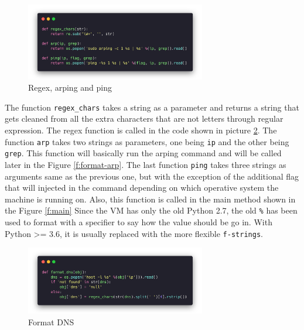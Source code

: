 \begin{figure}[H]
  \centering
  \includegraphics[width=0.7\textwidth]{figures/code/regex-arp-ping}
  \caption{Regex, arping and ping}
  \label{f:regex-arp-ping}
\end{figure}

The function \lstinline{regex_chars} takes a string as a parameter and returns a
string that gets cleaned from all the extra characters that are not letters
through regular expression. The regex function is called in the code shown in
picture \ref{f:format-dns}. The function \lstinline{arp} takes two strings as
parameters, one being \lstinline{ip} and the other being \lstinline{grep}. This
function will basically run the arping command and will be called later in the
Figure \ref{f:format-arp}. The last function \lstinline{ping} takes three
strings as arguments same as the previous one, but with the exception of the
additional flag that will injected in the command depending on which operative
system the machine is running on. Also, this function is called in the main
method shown in the Figure \ref{f:main} Since the VM has only the old Python 2.7,
the old \lstinline{%} has been used to format with a specifier to say how the
value should be go in. With Python >= 3.6, it is usually replaced with the more
flexible \lstinline{f-strings}.

\begin{figure}[H]
  \centering
  \includegraphics[width=0.7\textwidth]{figures/code/format-dns}
  \caption{Format DNS}
  \label{f:format-dns}
\end{figure}

